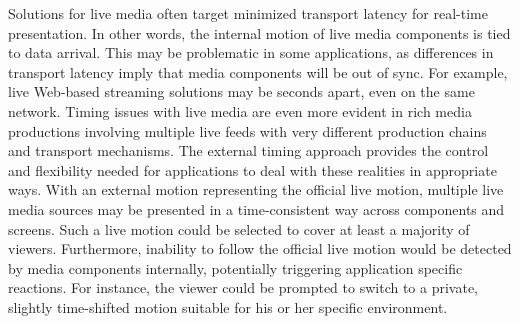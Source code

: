 Solutions for live media often target minimized transport latency for real-time 
presentation. In other words, the internal motion of live media
components is tied to data arrival. This may be problematic in some
applications, as differences in transport latency imply that media components
will be out of sync. For example, live Web-based streaming solutions may be
seconds apart, even on the same network. Timing issues with live media are even
more evident in rich media productions involving multiple live feeds with very
different production chains and transport mechanisms. The external timing
approach provides the control and flexibility needed for applications to deal
with these realities in appropriate ways. With an external motion representing
the official live motion, multiple live media sources may be presented in a
time-consistent way across components and screens. Such a live motion could be
selected to cover at least a majority of viewers. Furthermore, inability to
follow the official live motion would be detected by media components
internally, potentially triggering application specific reactions. For
instance, the viewer could be prompted to switch to a private, slightly time-shifted 
motion suitable for his or her specific environment.

